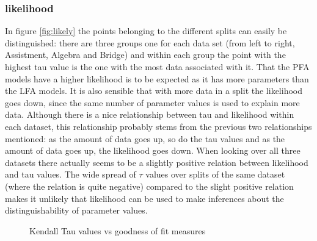 \documentclass{scrartcl}
\begin{document}
\subsubsection{likelihood}
In figure \ref{fig:likely} the points belonging to the different splits can easily be distinguished: there are three groups one for each data set (from left to right, Assistment, Algebra and Bridge) and within each group the point with the highest tau value is the one with the most data associated with it. That the PFA models have a higher likelihood is to be expected as it has more parameters than the LFA models. It is also sensible that with more data in a split the likelihood goes down, since the same number of parameter values is used to explain more data. Although there is a nice relationship between tau and likelihood within each dataset, this relationship probably stems from the previous two relationships mentioned: as the amount of data goes up, so do the tau values and as the amount of data goes up, the likelihood goes down. When looking over all three datasets there actually seems to be a slightly positive relation between likelihood and tau values. The wide spread of $\tau$ values over splits of the same dataset (where the relation is quite negative) compared to the slight positive relation makes it unlikely that likelihood can be used to make inferences about the distinguishability of parameter values.   

\begin{figure}[!htbp]
\centering
{}
\caption{Kendall Tau values vs goodness of fit measures}
\end{figure}
\end{document}
